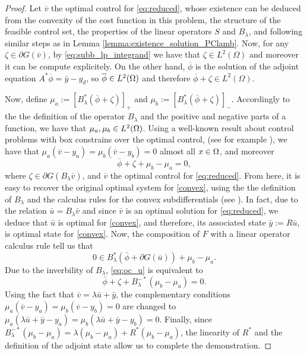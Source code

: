 \begin{proof}
    Let $\overline{v}$ the optimal control for \eqref{eq:reduced}, whose existence 
	can be deduced from the convexity of the cost function in this problem, the 
	structure of the feasible control set, the properties of the linear operators 
	$S$ and $B_{\lambda}$, and following similar steps as in Lemma \ref{lemma:existence_solution_PClamb}. 
	Now, for any $\zeta\in \partial G(\overline{v})$, by \eqref{eq:subb_lp_integrand} 
	we have that $\zeta\in L^2(\Omega)$ and moreover it can be compute explicitely.
	 On the other hand, $\overline{\phi}$ is the solution of the adjoint equation 
	 $A^*\overline{\phi}=\bar{y}-y_d$, so $\overline{\phi}\in L^2(\Omega)$ and therefore 
	 $\overline{\phi}+\zeta \in L^2(\Omega)$. 
	 
	 Now, define $\mu_a:=[B_{\lambda}^*(\overline{\phi}+\zeta)]_+$ 
	 and $\mu_b:=[B_{\lambda}^*(\overline{\phi}+\zeta)]_-$. Accordingly to the the 
	 definition of the operator $B_{\lambda}$ and the positive and negative parts of a 
	 function, we have that $\mu_a, \mu_b\in L^2(\Omega)$. Using a well-known result about control 
	 problems with box constrains over the optimal control, (see for example \cite{troeltzsch2010}), 
	 we have that $\mu_{a}(\overline{v}-y_a)=\mu_b(\overline{v}-y_b)=0$ almost all $x\in \Omega$, and moreover 
   \[
   \overline{\phi}+\zeta+\mu_b-\mu_a=0,
   \]
   where $\zeta\in \partial G(B_{\lambda}\overline{v})$, and $\overline{v}$ the optimal control for \eqref{eq:reduced}. From here, it is easy to recover the original optimal system for \eqref{convex}, using the the definition of $B_{\lambda}$ and the calculus rules for the convex subdifferentials (see \cite{combettes}). In fact, due to the relation $\bar{u} = B_\lambda \bar v$ and since $\overline{v}$ is an optimal solution for \eqref{eq:reduced}, we deduce that $\bar{u}$ is optimal for \eqref{convex}, and therefore, its associated state $\bar{y}:=R\bar{u}$, is optimal state for \eqref{convex}. Now, the composition of $F$ with a linear operator calculus rule tell us that 
\begin{equation}\label{eq:oc_u}
    0 \in B_\lambda^*(\bar \phi + \partial G(\bar u)) + \mu_b-\mu_a.
\end{equation}
Due to the inverbility of $B_{\lambda}$, \eqref{eq:oc_u} is equivalent to
\[
\bar \phi+\zeta+B^{-*}_{\lambda}(\mu_b-\mu_a)=0.
\]
Using the fact that $\overline{v}=\lambda\bar{u}+\bar{y}$, the complementary conditions $\mu_{a}(\overline{v}-y_a)=\mu_b(\overline{v}-y_b)=0$ are changed to $\mu_a(\lambda\bar{u}+\bar{y}-y_a)=\mu_b(\lambda\bar{u}+\bar{y}-y_b)=0$. Finally, since $B^{-*}_{\lambda}(\mu_b-\mu_a)=\lambda(\mu_b-\mu_a)+R^*(\mu_b-\mu_a)$, the linearity of $R^*$ and the definition of the adjoint state allow us to complete the demonstration.
\end{proof}

